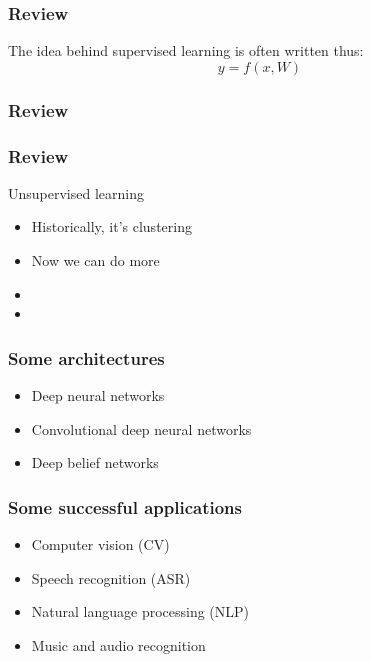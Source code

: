\begin{frame}
  \frametitle{Review}
  The idea behind supervised learning is often written thus:
  \begin{displaymath}
    y = f(x,W)
  \end{displaymath}
\end{frame}

\begin{frame}
  \frametitle{Review}
\end{frame}

\begin{frame}
  \frametitle{Review}
  Unsupervised learning
  \begin{itemize}
  \item<1-> Historically, it's clustering
  \item<1-> Now we can do more
  \item<2-> 
  \item<2->
  \end{itemize}
\end{frame}

\begin{frame}
  \frametitle{Some architectures}
  \begin{itemize}
  \item Deep neural networks
  \item Convolutional deep neural networks
  \item Deep belief networks
  \end{itemize}
\end{frame}

\begin{frame}
  \frametitle{Some successful applications}
  \begin{itemize}
  \item Computer vision (CV)
  \item Speech recognition (ASR)
  \item Natural language processing (NLP)
  \item Music and audio recognition
  \end{itemize}
\end{frame}

